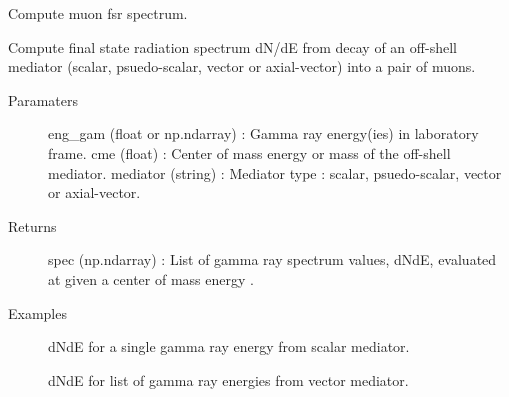 \documentclass[letterpaper,10pt,english]{sphinxmanual}
\begin{document}
\begin{fulllineitems}
\label{\detokenize{modules:hazma.muon.fsr}}
Compute muon fsr spectrum.

Compute final state radiation spectrum dN/dE from decay of an off-shell
mediator (scalar, psuedo-scalar, vector or axial-vector) into a pair of
muons.
\begin{description}
\item[{Paramaters}] \leavevmode
eng\_gam (float or np.ndarray) : Gamma ray energy(ies) in laboratory
frame.
cme (float) : Center of mass energy or mass of the off-shell mediator.
mediator (string) : Mediator type : scalar, psuedo-scalar, vector or
axial-vector.

\item[{Returns}] \leavevmode
spec (np.ndarray) : List of gamma ray spectrum values, dNdE, evaluated
at  given a center of mass energy .

\item[{Examples}] \leavevmode
dNdE for a single gamma ray energy from scalar mediator.

\begin{sphinxVerbatim}[commandchars=\\\{\}]
   
    
    
\end{sphinxVerbatim}

dNdE for list of gamma ray energies from vector mediator.

\begin{sphinxVerbatim}[commandchars=\\\{\}]
   
     
  
    
\end{sphinxVerbatim}

\end{description}

\end{fulllineitems}
\end{document}
